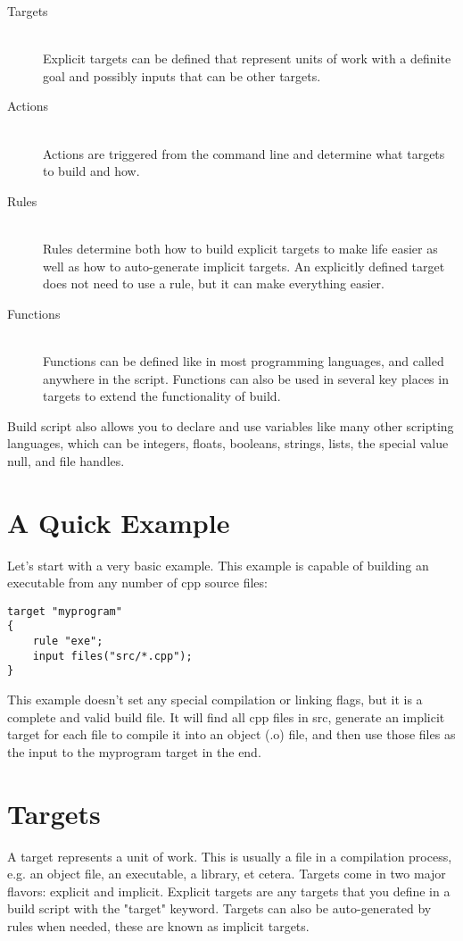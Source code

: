 \documentclass[letterpaper]{book}
\begin{document}
\begin{description}
    \item[Targets] \hfill \\
    Explicit targets can be defined that represent units of work with a definite
    goal and possibly inputs that can be other targets.
    \item[Actions] \hfill \\
    Actions are triggered from the command line and determine what targets to
    build and how.
    \item[Rules] \hfill \\
    Rules determine both how to build explicit targets to make life easier as
    well as how to auto-generate implicit targets.  An explicitly defined target
    does not need to use a rule, but it can make everything easier.
    \item[Functions] \hfill \\
    Functions can be defined like in most programming languages, and called
    anywhere in the script.  Functions can also be used in several key places in
    targets to extend the functionality of build.
\end{description}

Build script also allows you to declare and use variables like many other
scripting languages, which can be integers, floats, booleans, strings, lists,
the special value null, and file handles.

\section{A Quick Example}
Let's start with a very basic example.  This example is capable of building an
executable from any number of cpp source files:

\begin{lstlisting}
target "myprogram"
{
    rule "exe";
    input files("src/*.cpp");
}
\end{lstlisting}

This example doesn't set any special compilation or linking flags, but it is a
complete and valid build file.  It will find all cpp files in src, generate an
implicit target for each file to compile it into an object (.o) file, and then
use those files as the input to the myprogram target in the end.

\section{Targets}
A target represents a unit of work.  This is usually a file in a compilation
process, e.g. an object file, an executable, a library, et cetera.  Targets
come in two major flavors: explicit and implicit.  Explicit targets are any
targets that you define in a build script with the "target" keyword.  Targets
can also be auto-generated by rules when needed, these are known as implicit
targets.
\end{document}
